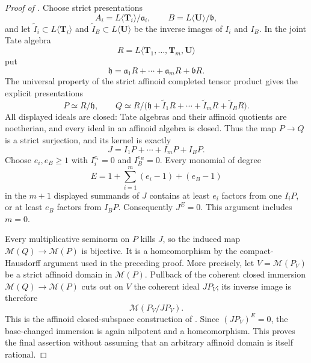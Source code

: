 \begin{proof}[Proof of ]
Choose strict presentations
\[
 A_i=L\langle\mathbf T_i\rangle/\mathfrak a_i,
 \qquad
 B=L\langle\mathbf U\rangle/\mathfrak b,
\]
and let \(\widetilde I_i\subset L\langle\mathbf T_i\rangle\) and
\(\widetilde I_B\subset L\langle\mathbf U\rangle\) be the inverse images
of \(I_i\) and \(I_B\).  In the joint Tate algebra
\[
 R=L\langle\mathbf T_1,\ldots,\mathbf T_m,\mathbf U\rangle
\]
put
\[
 \mathfrak h=\mathfrak a_1R+\cdots+\mathfrak a_mR+\mathfrak bR.
\]
The universal property of the strict affinoid completed tensor product
gives the explicit presentations
\[
 P\simeq R/\mathfrak h,
 \qquad
 Q\simeq R/\bigl(\mathfrak h+\widetilde I_1R+\cdots+
                      \widetilde I_mR+\widetilde I_BR\bigr).
\]
All displayed ideals are closed: Tate algebras and their affinoid quotients
are noetherian, and every ideal in an affinoid algebra is closed.  Thus the
map \(P\to Q\) is a strict surjection, and its kernel is exactly
\[
                         J=I_1P+\cdots+I_mP+I_BP.
\]
Choose \(e_i,e_B\geq1\) with \(I_i^{e_i}=0\) and \(I_B^{e_B}=0\).
Every monomial of degree
\[
                         E=1+\sum_{i=1}^m(e_i-1)+(e_B-1)
\]
in the \(m+1\) displayed summands of \(J\) contains at least \(e_i\)
factors from one \(I_iP\), or at least \(e_B\) factors from \(I_BP\).
Consequently \(J^E=0\).  This argument includes \(m=0\).

Every multiplicative seminorm on \(P\) kills \(J\), so the induced map
\(\mathcal M(Q)\to\mathcal M(P)\) is bijective.  It is a homeomorphism by
the compact-Hausdorff argument used in the preceding proof.  More
precisely, let \(V=\mathcal M(P_V)\) be a strict affinoid domain in
\(\mathcal M(P)\).  Pullback of the coherent closed immersion
\(\mathcal M(Q)\to\mathcal M(P)\) cuts out on \(V\) the coherent ideal
\(JP_V\); its inverse image is therefore
\[
                         \mathcal M(P_V/JP_V).
\]
This is the affinoid closed-subspace construction of
\cite[\S11.2.2]{CLD25}.  Since \((JP_V)^E=0\), the base-changed immersion
is again nilpotent and a homeomorphism.  This proves the final assertion
without assuming that an arbitrary affinoid domain is itself rational.
\end{proof}

